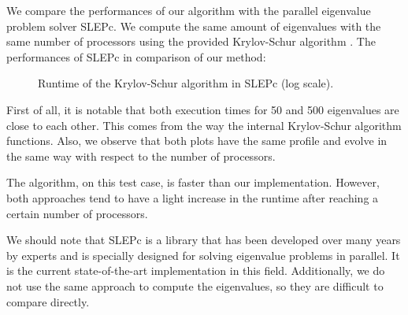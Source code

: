 We compare the performances of our algorithm with the parallel eigenvalue problem solver SLEPc.
We compute the same amount of eigenvalues with the same number of processors using the provided Krylov-Schur algorithm \cite{stewart_krylovschur_2002}.
The performances of SLEPc in comparison of our method:

\begin{figure}[H]
  \centering
  
  \caption{Runtime of the Krylov-Schur algorithm in SLEPc (log scale).}
\end{figure}

First of all, it is notable that both execution times for 50 and 500 eigenvalues are close to each other.
This comes from the way the internal Krylov-Schur algorithm functions.
Also, we observe that both plots have the same profile and evolve in the same way with respect to the number of processors.

The algorithm, on this test case, is faster than our implementation.
However, both approaches tend to have a light increase in the runtime after reaching a certain number of processors.

We should note that SLEPc is a library that has been developed over many years by experts and is specially designed for solving eigenvalue problems in parallel.
It is the current state-of-the-art implementation in this field.
Additionally, we do not use the same approach to compute the eigenvalues, so they are difficult to compare directly.
